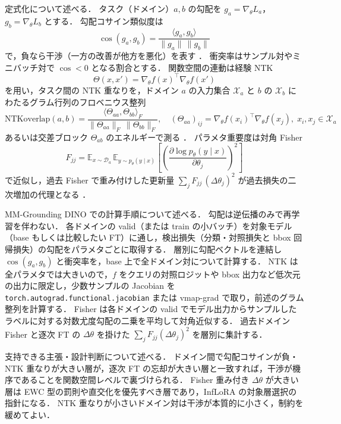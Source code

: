 定式化について述べる．
タスク（ドメイン）$a, b$ の勾配を $g_a = \nabla_\theta L_a$，$g_b = \nabla_\theta L_b$ とする．
勾配コサイン類似度は
\begin{equation}
\cos(g_a, g_b) = \frac{\langle g_a, g_b \rangle}{\| g_a \| \, \| g_b \|}
\end{equation}
で，負なら干渉（一方の改善が他方を悪化）を表す \cite{pcgrad}．
衝突率はサンプル対やミニバッチ対で $\cos < 0$ となる割合とする．
関数空間の連動は経験 NTK
\begin{equation}
\Theta(x, x') = \nabla_\theta f(x)^{\top} \nabla_\theta f(x')
\end{equation}
を用い，タスク間の NTK 重なりを，ドメイン $a$ の入力集合 $\mathcal{X}_a$ と $b$ の $\mathcal{X}_b$ にわたるグラム行列のフロベニウス整列
\begin{equation}
\mathrm{NTKoverlap}(a,b) = \frac{\langle \Theta_{aa}, \Theta_{bb} \rangle_F}{\| \Theta_{aa} \|_F \, \| \Theta_{bb} \|_F}, \quad (\Theta_{aa})_{ij} = \nabla_\theta f(x_i)^{\top}\nabla_\theta f(x_j), \; x_i, x_j \in \mathcal{X}_a
\end{equation}
あるいは交差ブロック $\Theta_{ab}$ のエネルギーで測る \cite{ntkoverlap}．
パラメタ重要度は対角 Fisher
\begin{equation}
F_{jj} = \mathbb{E}_{x \sim \mathcal{D}_a} \, \mathbb{E}_{y \sim p_\theta(y \mid x)} \left[ \left( \frac{\partial \log p_\theta(y \mid x)}{\partial \theta_j} \right)^2 \right]
\end{equation}
で近似し，過去 Fisher で重み付けした更新量 $\sum_j F_{jj}\, (\Delta\theta_j)^2$ が過去損失の二次増加の代理となる \cite{ewc}．

MM-Grounding DINO での計算手順について述べる．
勾配は逆伝播のみで再学習を伴わない．
各ドメインの valid（または train の小バッチ）を対象モデル（base もしくは比較したい FT）に通し，検出損失（分類・対照損失と bbox 回帰損失）の勾配をパラメタごとに取得する．
層別に勾配ベクトルを連結し $\cos(g_a, g_b)$ と衝突率を，base 上で全ドメイン対について計算する．
NTK は全パラメタでは大きいので，$f$ をクエリの対照ロジットや bbox 出力など低次元の出力に限定し，少数サンプルの Jacobian を \verb|torch.autograd.functional.jacobian| または vmap-grad で取り，前述のグラム整列を計算する．
Fisher は各ドメインの valid でモデル出力からサンプルしたラベルに対する対数尤度勾配の二乗を平均して対角近似する．
過去ドメイン Fisher と逐次 FT の $\Delta\theta$ を掛けた $\sum_j F_{jj}(\Delta\theta_j)^2$ を層別に集計する．

支持できる主張・設計判断について述べる．
ドメイン間で勾配コサインが負・NTK 重なりが大きい層が，逐次 FT の忘却が大きい層と一致すれば，干渉が機序であることを関数空間レベルで裏づけられる．
Fisher 重み付き $\Delta\theta$ が大きい層は EWC 型の罰則や直交化を優先すべき層であり，InfLoRA の対象層選択の指針になる．
NTK 重なりが小さいドメイン対は干渉が本質的に小さく，制約を緩めてよい．

